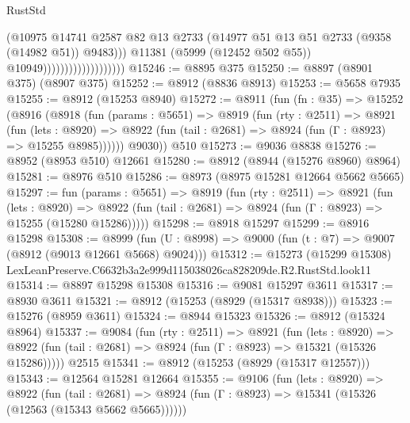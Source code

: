 \begin{lexlean}{RustStd}
\begin{coremodule}
                                            (@10975
                                              @14741
                                              @2587
                                              @82
                                              @13
                                              @2733
                                              (@14977
                                                @51
                                                @13
                                                @51
                                                @2733
                                                (@9358 (@14982 @51))
                                                @9483)))
                                          @11381
                                          (@5999 (@12452 @502 @55))
                                          @10949)))))))))))))))))))
@15246 := @8895 @375
@15250 := @8897 (@8901 @375) (@8907 @375)
@15252 := @8912 (@8836 @8913)
@15253 := @5658 @7935
@15255 := @8912 (@15253 @8940)
@15272 := @8911
    (fun (fn : @35) =>
    @15252
      (@8916
        (@8918
          (fun (params : @5651) =>
          @8919
            (fun (rty : @2511) =>
            @8921
              (fun (lets : @8920) =>
              @8922 (fun (tail : @2681) => @8924 (fun (Γ : @8923) => @15255 @8985))))))
        @9030))
    @510
@15273 := @9036 @8838
@15276 := @8952 (@8953 @510) @12661
@15280 := @8912 (@8944 (@15276 @8960) @8964)
@15281 := @8976 @510
@15286 := @8973 (@8975 @15281 @12664 @5662 @5665)
@15297 := fun (params : @5651) =>
  @8919
    (fun (rty : @2511) =>
    @8921
      (fun (lets : @8920) =>
      @8922 (fun (tail : @2681) => @8924 (fun (Γ : @8923) => @15255 (@15280 @15286)))))
@15298 := @8918 @15297
@15299 := @8916 @15298
@15308 := @8999
    (fun (U : @8998) => @9000 (fun (t : @7) => @9007 (@8912 (@9013 @12661 @5668) @9024)))
@15312 := @15273 (@15299 @15308) LexLeanPreserve.C6632b3a2e999d115038026ca828209de.R2.RustStd.look11
@15314 := @8897 @15298 @15308
@15316 := @9081 @15297 @3611
@15317 := @8930 @3611
@15321 := @8912 (@15253 (@8929 (@15317 @8938)))
@15323 := @15276 (@8959 @3611)
@15324 := @8944 @15323
@15326 := @8912 (@15324 @8964)
@15337 := @9084
    (fun (rty : @2511) =>
    @8921
      (fun (lets : @8920) =>
      @8922 (fun (tail : @2681) => @8924 (fun (Γ : @8923) => @15321 (@15326 @15286)))))
    @2515
@15341 := @8912 (@15253 (@8929 (@15317 @12557)))
@15343 := @12564 @15281 @12664
@15355 := @9106
    (fun (lets : @8920) =>
    @8922
      (fun (tail : @2681) =>
      @8924 (fun (Γ : @8923) => @15341 (@15326 (@12563 (@15343 @5662 @5665))))))

\end{coremodule}
\end{lexlean}
